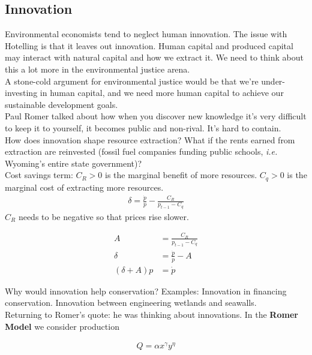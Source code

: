 \documentclass[12pt]{article}
\begin{document}
\subsection{Innovation}

Environmental economists tend to neglect human innovation. The issue with Hotelling is that it leaves out innovation. Human capital and produced capital may interact with natural capital and how we extract it. We need to think about this a lot more in the environmental justice arena. \\

A stone-cold argument for environmental justice would be that we're under-investing in human capital, and we need more human capital to achieve our sustainable development goals.  \\

Paul Romer talked about how when you discover new knowledge it's very difficult to keep it to yourself, it becomes public and non-rival. It's hard to contain. \\

How does innovation shape resource extraction? What if the rents earned from extraction are reinvested (fossil fuel companies funding public schools, \textit{i.e.} Wyoming's entire state government)? \\

Cost savings term:
$C_R>0$ is the marginal benefit of more resources. $C_q>0$ is the marginal cost of extracting more resources.
\begin{align}
    \delta = \frac{\dot p}{p} - \frac{C_R}{p_{t-1} - C_q}
\end{align}
$C_R$ needs to be negative so that prices rise slower. 

\begin{align}
    A &= \frac{C_R}{p_{t-1} - C_q}\\
    \delta &= \frac{\dot p }{p} - A\\
    (\delta + A)p &= \dot p
\end{align}

Why would innovation help conservation? Examples: Innovation in financing conservation. Innovation between engineering wetlands and seawalls. \\

Returning to Romer's quote: he was thinking about innovations. In the \textbf{Romer Model} we consider production 

\begin{align}
    Q = \alpha x^\gamma y^\eta
\end{align}
\end{document}
